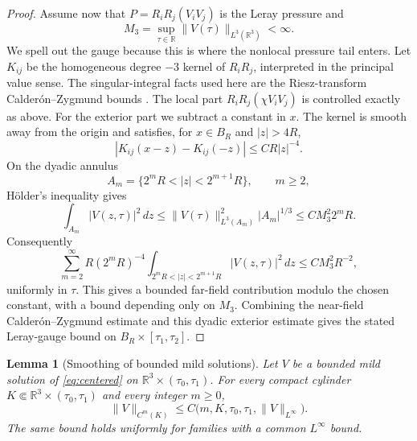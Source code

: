 \documentclass[11pt]{amsart}
\theoremstyle{plain}
\newtheorem{lemma}[theorem]{Lemma}
\theoremstyle{definition}
\theoremstyle{remark}
\numberwithin{equation}{section}
\begin{document}
\begin{proof}
Assume now that \(P=R_iR_j(V_iV_j)\) is the Leray pressure and
\[
   M_3=\sup_{\tau\in\mathbb R}\|V(\tau)\|_{L^3(\mathbb R^3)}<\infty .
\]
We spell out the gauge because this is where the nonlocal pressure tail
enters.  Let \(K_{ij}\) be the homogeneous
degree \(-3\) kernel of \(R_iR_j\), interpreted in the principal value sense.
The singular-integral facts used here are the Riesz-transform
Calder\'on--Zygmund bounds \cite{Stein1970}.  The local part
\(R_iR_j(\chi V_iV_j)\) is controlled exactly as above.  For the exterior part
we subtract a constant in \(x\).  The kernel is smooth away from the origin
and satisfies, for
\(x\in B_R\) and \(|z|>4R\),
\[
   |K_{ij}(x-z)-K_{ij}(-z)|\le CR|z|^{-4}.
\]
On the dyadic annulus
\[
   A_m=\{2^mR<|z|<2^{m+1}R\},\qquad m\ge2,
\]
H\"older's inequality gives
\[
   \int_{A_m}|V(z,\tau)|^2\,dz
   \le
   \|V(\tau)\|_{L^3(A_m)}^2 |A_m|^{1/3}
   \le C M_3^2 2^mR .
\]
Consequently
\[
   \sum_{m=2}^\infty
   R(2^mR)^{-4}
   \int_{2^mR<|z|<2^{m+1}R}|V(z,\tau)|^2\,dz
   \le
   C M_3^2 R^{-2},
\]
uniformly in \(\tau\).  This gives a bounded far-field contribution modulo
the chosen constant, with a bound depending only on \(M_3\).  Combining the
near-field Calder\'on--Zygmund estimate and this dyadic exterior estimate gives
the stated Leray-gauge bound on \(B_R\times[\tau_1,\tau_2]\).
\end{proof}

\begin{lemma}[Smoothing of bounded mild solutions]\label{lem:mild-smoothing}
Let \(V\) be a bounded mild solution of \eqref{eq:centered} on
\(\mathbb R^3\times(\tau_0,\tau_1)\).  For every compact cylinder
\(K\Subset\mathbb R^3\times(\tau_0,\tau_1)\) and every integer \(m\ge0\),
\[
   \|V\|_{C^m(K)}
   \le
   C\bigl(m,K,\tau_0,\tau_1,\|V\|_{L^\infty}\bigr).
\]
The same bound holds uniformly for families with a common \(L^\infty\) bound.
\end{lemma}
\end{document}
